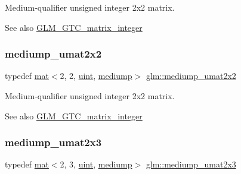 Medium-\/qualifier unsigned integer 2x2 matrix. \begin{DoxySeeAlso}{See also}
\hyperlink{group__gtc__matrix__integer}{G\+L\+M\+\_\+\+G\+T\+C\+\_\+matrix\+\_\+integer} 
\end{DoxySeeAlso}
\mbox{\label{group__gtc__matrix__integer_ga539a528818569c17e68e77afce7755c2}} 
\subsubsection{\texorpdfstring{mediump\+\_\+umat2x2}{mediump\_umat2x2}}
{\footnotesize\ttfamily typedef \hyperlink{structglm_1_1mat}{mat}$<$2, 2, \hyperlink{group__core__precision_ga4fd29415871152bfb5abd588334147c8}{uint}, \hyperlink{namespaceglm_a36ed105b07c7746804d7fdc7cc90ff25a6416f3ea0c9025fb21ed50c4d6620482}{mediump}$>$ \hyperlink{group__gtc__matrix__integer_ga539a528818569c17e68e77afce7755c2}{glm\+::mediump\+\_\+umat2x2}}

Medium-\/qualifier unsigned integer 2x2 matrix. \begin{DoxySeeAlso}{See also}
\hyperlink{group__gtc__matrix__integer}{G\+L\+M\+\_\+\+G\+T\+C\+\_\+matrix\+\_\+integer} 
\end{DoxySeeAlso}
\mbox{\label{group__gtc__matrix__integer_ga15d2790e10b27b145cd748abffde8968}} 
\subsubsection{\texorpdfstring{mediump\+\_\+umat2x3}{mediump\_umat2x3}}
{\footnotesize\ttfamily typedef \hyperlink{structglm_1_1mat}{mat}$<$2, 3, \hyperlink{group__core__precision_ga4fd29415871152bfb5abd588334147c8}{uint}, \hyperlink{namespaceglm_a36ed105b07c7746804d7fdc7cc90ff25a6416f3ea0c9025fb21ed50c4d6620482}{mediump}$>$ \hyperlink{group__gtc__matrix__integer_ga15d2790e10b27b145cd748abffde8968}{glm\+::mediump\+\_\+umat2x3}}

